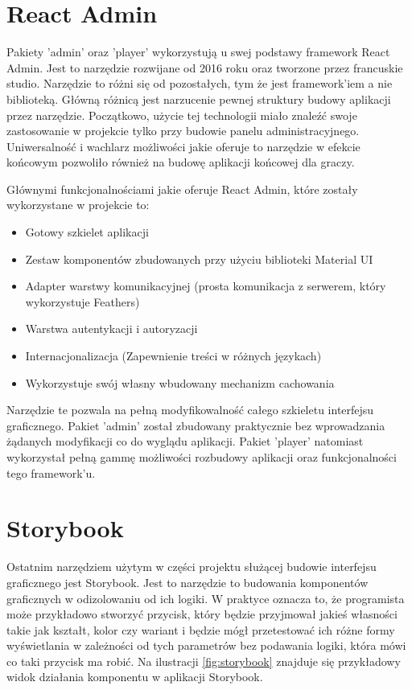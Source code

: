 \section{React Admin}
Pakiety 'admin' oraz 'player' wykorzystują u swej podstawy framework React Admin. Jest to narzędzie rozwijane od 2016 roku oraz tworzone przez francuskie studio. Narzędzie to różni się od pozostałych, tym że jest framework'iem a nie biblioteką. Główną różnicą jest narzucenie pewnej struktury budowy aplikacji przez narzędzie. Początkowo, użycie tej technologii miało znaleźć swoje zastosowanie w projekcie tylko przy budowie panelu administracyjnego. Uniwersalność i wachlarz możliwości jakie oferuje to narzędzie w efekcie końcowym pozwoliło również na budowę aplikacji końcowej dla graczy.

Głównymi funkcjonalnościami jakie oferuje React Admin, które zostały wykorzystane w projekcie to:

\begin{itemize}
    \item Gotowy szkielet aplikacji
    \item Zestaw komponentów zbudowanych przy użyciu biblioteki Material UI
    \item Adapter warstwy komunikacyjnej (prosta komunikacja z serwerem, który wykorzystuje Feathers)
    \item Warstwa autentykacji i autoryzacji
    \item Internacjonalizacja (Zapewnienie treści w różnych językach)
    \item Wykorzystuje swój własny wbudowany mechanizm cachowania
\end{itemize}

Narzędzie te pozwala na pełną modyfikowalność całego szkieletu interfejsu graficznego. Pakiet 'admin' został zbudowany praktycznie bez wprowadzania żądanych modyfikacji co do wyglądu aplikacji. Pakiet 'player' natomiast wykorzystał pełną gammę możliwości rozbudowy aplikacji oraz funkcjonalności tego framework'u.

\section{Storybook}
Ostatnim narzędziem użytym w części projektu służącej budowie interfejsu graficznego jest Storybook. Jest to narzędzie to budowania komponentów graficznych w odizolowaniu od ich logiki. W praktyce oznacza to, że programista może przykładowo stworzyć przycisk, który będzie przyjmował jakieś własności takie jak kształt, kolor czy wariant i będzie mógł przetestować ich różne formy wyświetlania w zależności od tych parametrów bez podawania logiki, która mówi co taki przycisk ma robić. Na ilustracji \ref{fig:storybook} znajduje się przykładowy widok działania komponentu w aplikacji Storybook.

